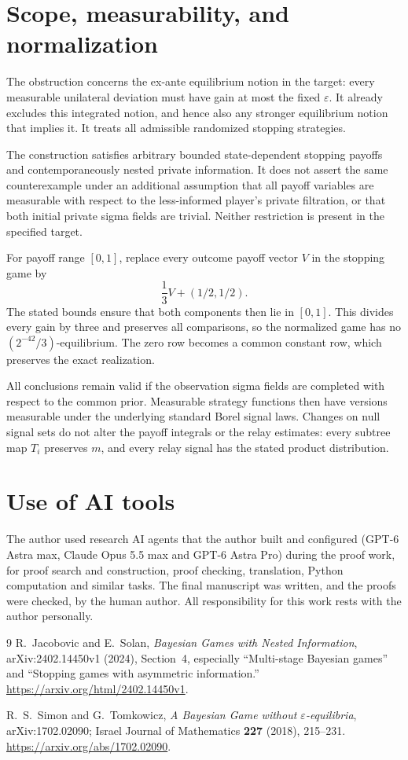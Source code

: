 \documentclass[11pt]{article}
\theoremstyle{remark}
\begin{document}
\section{Scope, measurability, and normalization}

The obstruction concerns the ex-ante equilibrium notion in the target:
every measurable unilateral deviation must have gain at most the fixed
$\varepsilon$. It already excludes this integrated notion, and hence
also any stronger equilibrium notion that implies it. It treats all
admissible randomized stopping strategies.

The construction satisfies arbitrary bounded state-dependent stopping
payoffs and contemporaneously nested private information. It does not
assert the same counterexample under an additional assumption that all
payoff variables are measurable with respect to the less-informed
player's private filtration, or that both initial private sigma fields
are trivial. Neither restriction is present in the specified target.

For payoff range $[0,1]$, replace every outcome payoff vector $V$ in
the stopping game by
\[
 \frac13V+(1/2,1/2).
\]
The stated bounds ensure that both components then lie in $[0,1]$.
This divides every gain by three and preserves all comparisons, so the
normalized game has no $(2^{-42}/3)$-equilibrium. The zero row becomes
a common constant row, which preserves the exact realization.

All conclusions remain valid if the observation sigma fields are
completed with respect to the common prior. Measurable strategy
functions then have versions measurable under the underlying standard
Borel signal laws. Changes on null signal sets do not alter the payoff
integrals or the relay estimates: every subtree map $T_i$ preserves
$m$, and every relay signal has the stated product distribution.

\section*{Use of AI tools}
The author used research AI agents that the author built and configured (GPT-6 Astra max,
Claude Opus 5.5 max and GPT-6 Astra Pro) during the proof work, for proof search and
construction, proof checking, translation, Python computation and similar tasks. The final
manuscript was written, and the proofs were checked, by the human author. All responsibility
for this work rests with the author personally.

\begin{thebibliography}{9}
R.~Jacobovic and E.~Solan,
\emph{Bayesian Games with Nested Information},
arXiv:2402.14450v1 (2024), Section~4, especially
``Multi-stage Bayesian games'' and
``Stopping games with asymmetric information.''
\url{https://arxiv.org/html/2402.14450v1}.

R.~S.~Simon and G.~Tomkowicz,
\emph{A Bayesian Game without $\varepsilon$-equilibria},
arXiv:1702.02090; Israel Journal of Mathematics \textbf{227}
(2018), 215--231.
\url{https://arxiv.org/abs/1702.02090}.
\end{thebibliography}
\end{document}
